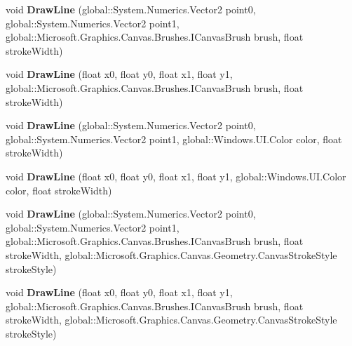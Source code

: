 \begin{DoxyCompactItemize}
void {\bfseries Draw\+Line} (global\+::\+System.\+Numerics.\+Vector2 point0, global\+::\+System.\+Numerics.\+Vector2 point1, global\+::\+Microsoft.\+Graphics.\+Canvas.\+Brushes.\+I\+Canvas\+Brush brush, float stroke\+Width)
\item 
\mbox{\label{interface_microsoft_1_1_graphics_1_1_canvas_1_1_i_canvas_drawing_session_a29b60d9da085ea054a4384b079481a46}} 
void {\bfseries Draw\+Line} (float x0, float y0, float x1, float y1, global\+::\+Microsoft.\+Graphics.\+Canvas.\+Brushes.\+I\+Canvas\+Brush brush, float stroke\+Width)
\item 
\mbox{\label{interface_microsoft_1_1_graphics_1_1_canvas_1_1_i_canvas_drawing_session_a1fb8e14a555b12cee02481b049136a39}} 
void {\bfseries Draw\+Line} (global\+::\+System.\+Numerics.\+Vector2 point0, global\+::\+System.\+Numerics.\+Vector2 point1, global\+::\+Windows.\+U\+I.\+Color color, float stroke\+Width)
\item 
\mbox{\label{interface_microsoft_1_1_graphics_1_1_canvas_1_1_i_canvas_drawing_session_a6444612b873b32ed2cf5e81d5275c96e}} 
void {\bfseries Draw\+Line} (float x0, float y0, float x1, float y1, global\+::\+Windows.\+U\+I.\+Color color, float stroke\+Width)
\item 
\mbox{\label{interface_microsoft_1_1_graphics_1_1_canvas_1_1_i_canvas_drawing_session_a7127eba36145630ee36730eeffcc1427}} 
void {\bfseries Draw\+Line} (global\+::\+System.\+Numerics.\+Vector2 point0, global\+::\+System.\+Numerics.\+Vector2 point1, global\+::\+Microsoft.\+Graphics.\+Canvas.\+Brushes.\+I\+Canvas\+Brush brush, float stroke\+Width, global\+::\+Microsoft.\+Graphics.\+Canvas.\+Geometry.\+Canvas\+Stroke\+Style stroke\+Style)
\item 
\mbox{\label{interface_microsoft_1_1_graphics_1_1_canvas_1_1_i_canvas_drawing_session_a2d08811c378c0cbcef05802c8158558a}} 
void {\bfseries Draw\+Line} (float x0, float y0, float x1, float y1, global\+::\+Microsoft.\+Graphics.\+Canvas.\+Brushes.\+I\+Canvas\+Brush brush, float stroke\+Width, global\+::\+Microsoft.\+Graphics.\+Canvas.\+Geometry.\+Canvas\+Stroke\+Style stroke\+Style)

\end{DoxyCompactItemize}
